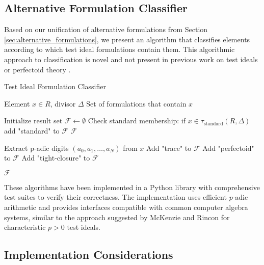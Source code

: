 \subsection{Alternative Formulation Classifier}

Based on our unification of alternative formulations from Section \ref{sec:alternative_formulations}, we present an algorithm that classifies elements according to which test ideal formulations contain them. This algorithmic approach to classification is novel and not present in previous work on test ideals \cite{BMPSTWW20} or perfectoid theory \cite{AMBT19}.

\begin{algorithm}[H]
\caption{Test Ideal Formulation Classifier}
\label{alg:formulation-classifier}
\begin{algorithmic}[1]
\Require Element $x \in R$, divisor $\Delta$
\Ensure Set of formulations that contain $x$

\State Initialize result set $\mathcal{F} \gets \emptyset$
\State Check standard membership: if $x \in \tau_{\text{standard}}(R,\Delta)$ add "standard" to $\mathcal{F}$
    \State \Return $\mathcal{F}$ 
\EndIf

\State Extract p-adic digits $(a_0, a_1, \ldots, a_N)$ from $x$
 
    \State Add "trace" to $\mathcal{F}$
\EndIf
{} 
    \State Add "perfectoid" to $\mathcal{F}$
\EndIf
{} 
    \State Add "tight-closure" to $\mathcal{F}$
\EndIf

\State \Return $\mathcal{F}$
\end{algorithmic}
\end{algorithm}

\begin{remark}
These algorithms have been implemented in a Python library with comprehensive test suites to verify their correctness. The implementation uses efficient $p$-adic arithmetic and provides interfaces compatible with common computer algebra systems, similar to the approach suggested by McKenzie and Rincon \cite{MR18} for characteristic $p > 0$ test ideals.
\end{remark}

\subsection{Implementation Considerations}


